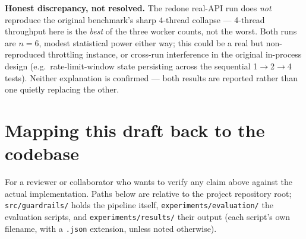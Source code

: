 \documentclass[pdflatex,sn-mathphys-num]{sn-jnl}%
\begin{document}
\begin{appendices}
\textbf{Honest discrepancy, not resolved.} The redone real-API run does
\textit{not} reproduce the original benchmark's sharp 4-thread
collapse --- 4-thread throughput here is the \textit{best} of the three
worker counts, not the worst. Both runs are $n=6$, modest statistical
power either way; this could be a real but non-reproduced throttling
instance, or cross-run interference in the original in-process design
(e.g.\ rate-limit-window state persisting across the sequential
1$\to$2$\to$4 tests). Neither explanation is confirmed --- both results
are reported rather than one quietly replacing the other.

\section{Mapping this draft back to the codebase}\label{secA1}

For a reviewer or collaborator who wants to verify any claim above
against the actual implementation. Paths below are relative to the
project repository root; \texttt{src/guardrails/} holds the pipeline
itself, \texttt{experiments/evaluation/} the evaluation scripts, and
\texttt{experiments/results/} their output (each script's own filename,
with a \texttt{.json} extension, unless noted otherwise).


\end{appendices}
\end{document}
